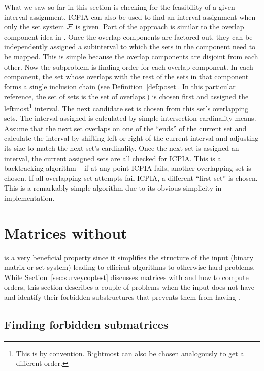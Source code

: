 What we saw so far in this section is checking for the feasibility of
a given interval assignment. ICPIA can also be used to find an
interval assignment when only the set system ${\cal F}$ is given. Part of
the approach is similar to the overlap component idea in \cite{fg65,
  wlh02}. Once the overlap components are factored out, they can be
independently assigned a subinterval to which the sets in the
component need to be mapped. This is simple because the overlap
components are disjoint from each other. Now the subproblem is finding
\COP order for each overlap component. In each component, the set
whose overlaps with the rest of the sets in that component forms a
single inclusion chain (see Definition~\ref{def:poset}. In this
particular reference, the set of sets is the set of overlaps.)  is
chosen first and assigned the leftmost\footnote{This is by
  convention. Rightmost can also be chosen analogously to get a
  different \COP order.} interval. The next candidate set is chosen
from this set's overlapping sets. The interval assigned is calculated
by simple intersection cardinality means. Assume that the next set
overlaps on one of the ``ends'' of the current set and calculate the
interval by shifting left or right of the current interval and
adjusting its size to match the next set's cardinality. Once the next
set is assigned an interval, the current assigned sets are all checked
for ICPIA. This is a backtracking algorithm -- if at any point ICPIA
fails, another overlapping set is chosen. If all overlapping set
attempts fail ICPIA, a different ``first set'' is chosen. This is a
remarkably simple algorithm due to its obvious simplicity in
implementation.

\section{Matrices without \COP}
\label{sec:surveycopopt}

\COP is a very beneficial property since it simplifies the structure
of the input (binary matrix or set system) leading to
efficient algorithms to otherwise hard problems.  While
Section~\ref{sec:surveycoptest} discusses matrices with \COP and how
to compute \COP orders, this section describes a couple of problems
when the input does not have \COP and identify their forbidden
substructures that prevents them from having \COP.

\subsection{Finding forbidden submatrices}
\label{sec:forbiddensubalgo}

